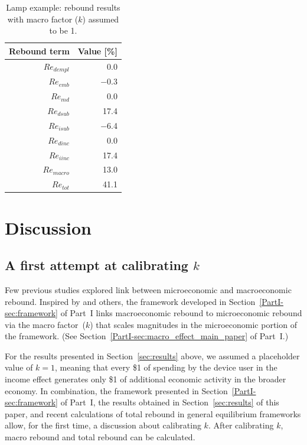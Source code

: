 \documentclass[12pt]{article}\usepackage[]{graphicx}\usepackage[]{xcolor}
\begin{document}
\begin{table}[ht]
\centering
\caption{Lamp example: rebound results with macro factor ($k$) assumed to be 1.} 
\label{tab:lamp_results}
\begin{tabular}{rr}
  \toprule
Rebound term & Value [\%] \\ 
  \midrule
$Re_{dempl}$ & 0.0 \\ 
  $Re_{emb}$ & $-$0.3 \\ 
  $Re_{md}$ & 0.0 \\ 
  $Re_{dsub}$ & 17.4 \\ 
  $Re_{isub}$ & $-$6.4 \\ 
  $Re_{dinc}$ & 0.0 \\ 
  $Re_{iinc}$ & 17.4 \\ 
  $Re_{macro}$ & 13.0 \\ 
   \midrule
$Re_{tot}$ & 41.1 \\ 
   \bottomrule
\end{tabular}
\end{table}




\section{Discussion}
\label{sec:discussion}

\subsection{A first attempt at calibrating $k$}
\label{sec:calibrating_k}



Few previous studies explored link 
between microeconomic and macroeconomic rebound.
Inspired by \citet{Borenstein:2015aa} and others, 
the framework developed in Section~\ref{PartI-sec:framework} of Part~I
links macroeconomic rebound to microeconomic rebound 
via the macro factor~($k$) that scales
magnitudes in the microeconomic portion of the framework. 
(See Section~\ref{PartI-sec:macro_effect_main_paper} of Part~I.)

For the results presented in Section~\ref{sec:results} above, 
we assumed a placeholder value of $k = 1$,
meaning that every \$1 of spending by the device user in the income effect
generates only \$1 of additional economic activity in the broader economy.
In combination, the framework presented in Section~\ref{PartI-sec:framework} of Part~I, 
the results obtained in Section~\ref{sec:results} of this paper, and
recent calculations of total rebound in general equilibrium frameworks allow, 
for the first time, 
a discussion about calibrating $k$.
After calibrating $k$, 
macro rebound and total rebound can be calculated.
\end{document}
